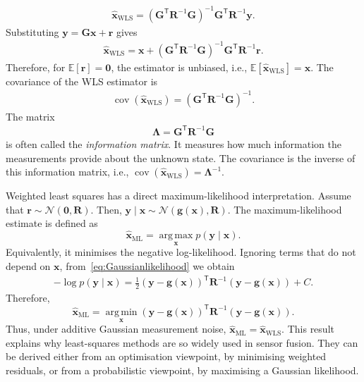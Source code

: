 \documentclass[graybox,envcountchap]{style/SNmono}
\begin{document}
\begin{align}
\widehat{\mathbf{x}}_{\mathrm{WLS}}
=
\left(
\mathbf{G}^{\mathsf T}
\mathbf{R}^{-1}
\mathbf{G}
\right)^{-1}
\mathbf{G}^{\mathsf T}
\mathbf{R}^{-1}
\mathbf{y}.
\end{align}
Substituting $\mathbf{y}=\mathbf{G}\mathbf{x}+\mathbf{r}$ gives
\begin{align}
\widehat{\mathbf{x}}_{\mathrm{WLS}}
=
\mathbf{x}
+
\left(
\mathbf{G}^{\mathsf T}
\mathbf{R}^{-1}
\mathbf{G}
\right)^{-1}
\mathbf{G}^{\mathsf T}
\mathbf{R}^{-1}
\mathbf{r}.
\end{align}
Therefore, for $\mathbb{E}
\left[\mathbf{r}\right]
=\mathbf{0}$, the estimator is unbiased, i.e., $\mathbb{E} \left[\widehat{\mathbf{x}}_{\mathrm{WLS}} \right] = \mathbf{x}$. The covariance of the WLS estimator is
\begin{align}
\operatorname{cov}
\left(
\widehat{\mathbf{x}}_{\mathrm{WLS}}
\right)
=
\left(
\mathbf{G}^{\mathsf T}
\mathbf{R}^{-1}
\mathbf{G}
\right)^{-1}.
\end{align}
The matrix
\begin{align}
\mathbf{\Lambda}
=
\mathbf{G}^{\mathsf T}
\mathbf{R}^{-1}
\mathbf{G}
\end{align}
is often called the \emph{information matrix}. It measures how much information the measurements provide about the unknown state. The covariance is the inverse of this information matrix, i.e., $\operatorname{cov} \left( \widehat{\mathbf{x}}_{\mathrm{WLS}} \right) = \mathbf{\Lambda}^{-1}$.

Weighted least squares has a direct maximum-likelihood interpretation. Assume that $\mathbf{r}
\sim
\mathcal{N}
\left(
\mathbf{0},
\mathbf{R}
\right)$. Then, $\mathbf{y}\mid\mathbf{x}
\sim
\mathcal{N}
\left(
\mathbf{g}(\mathbf{x}),
\mathbf{R}
\right)$.
The maximum-likelihood estimate is defined as
\begin{equation}
\widehat{\mathbf{x}}_{\mathrm{ML}}
=
\operatorname*{arg\,max}_{\mathbf{x}}
p(\mathbf{y}\mid\mathbf{x}).
\end{equation}
Equivalently, it minimises the negative log-likelihood. Ignoring terms that do not depend on $\mathbf{x}$, from~\eqref{eq:Gaussianlikelihood} we obtain
\begin{align*}
-\log p(\mathbf{y}\mid\mathbf{x}) =
\frac{1}{2}
\left(\mathbf{y} - \mathbf{g}(\mathbf{x}) \right)^{\mathsf T}
\mathbf{R}^{-1}
\left(
\mathbf{y}
-
\mathbf{g}(\mathbf{x})
\right)
+
C.
\end{align*}
Therefore,
\begin{equation}
\widehat{\mathbf{x}}_{\mathrm{ML}}
=
\operatorname*{arg\,min}_{\mathbf{x}}
\left(
\mathbf{y}
-
\mathbf{g}(\mathbf{x})
\right)^{\mathsf T}
\mathbf{R}^{-1}
\left(
\mathbf{y}
-
\mathbf{g}(\mathbf{x})
\right).
\end{equation}
Thus, under additive Gaussian measurement noise, $\widehat{\mathbf{x}}_{\mathrm{ML}} = \widehat{\mathbf{x}}_{\mathrm{WLS}}$. This result explains why least-squares methods are so widely used in sensor fusion. They can be derived either from an optimisation viewpoint, by minimising weighted residuals, or from a probabilistic viewpoint, by maximising a Gaussian likelihood.
\end{document}
